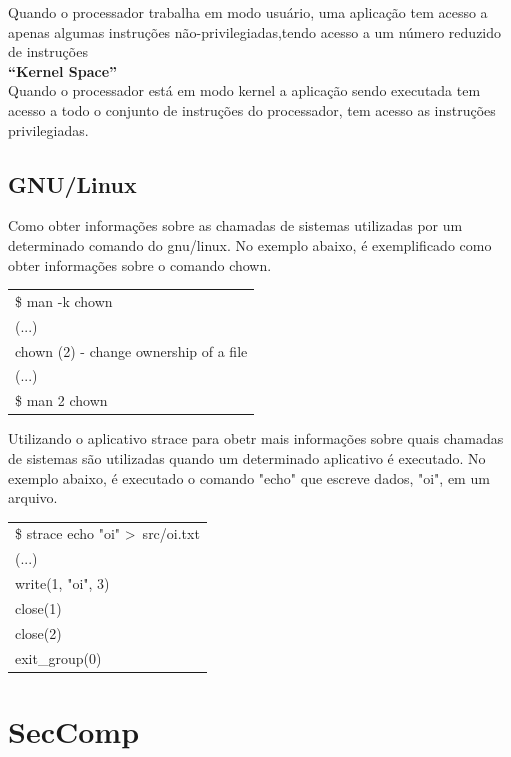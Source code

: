 \documentclass[12pt]{article}
\begin{document}
Quando o processador trabalha em  modo usuário, uma aplicação tem acesso a apenas algumas instruções não-privilegiadas,tendo acesso a um número reduzido de instruções\\

\textbf{“Kernel Space”}\\

Quando o processador está em modo kernel a aplicação sendo executada tem acesso a todo o conjunto de instruções do processador, tem acesso as instruções privilegiadas.\\

\subsection{GNU/Linux}

Como obter informações sobre as chamadas de sistemas utilizadas por um determinado comando do gnu/linux. No exemplo abaixo, é exemplificado como obter informações sobre o comando chown.

\begin{table}[H]
	\begin{tabular}{|l|}
	\hline
	\$ man -k chown\\
	(...)\\
	chown (2)            - change ownership of a file\\
	(...)\\
	\$ man 2 chown\\
	\hline
	\end{tabular}
\end{table}

Utilizando o aplicativo strace para obetr mais informações sobre quais chamadas de sistemas são utilizadas quando um determinado aplicativo é executado. No exemplo abaixo, é executado o comando "echo" que escreve dados, "oi", em um arquivo.

\begin{table}[H]
	\begin{tabular}{|l|}
	\hline
	\$ strace echo "oi"  \textgreater\ src/oi.txt\\
	(...)\\
	write(1, "oi", 3)\\
	close(1)\\
	close(2)\\
	exit\_group(0)\\
	\hline
	\end{tabular}
\end{table}

\section{SecComp}
\end{document}
